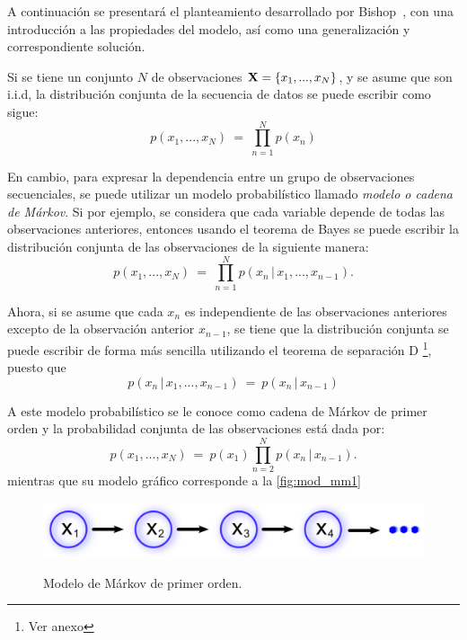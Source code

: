 A continuación se presentará el planteamiento desarrollado por Bishop~\cite{Bishop2006}, con una introducción a las propiedades del modelo, así como una generalización y correspondiente solución.

Si se tiene un conjunto $N$ de observaciones $\textbf{X} = \lbrace x_1, ..., x_N \rbrace$, y se asume que son i.i.d, la distribución conjunta de la secuencia de datos se puede escribir como sigue:
\begin{equation}
\label{eqn:2-1}
p(x_1, ..., x_N) ~=~ \prod_{n=1}^N p(x_n)
\end{equation}

En cambio, para expresar la dependencia entre un grupo de observaciones secuenciales, se puede utilizar un modelo probabilístico llamado \textit{modelo o cadena de Márkov}. Si por ejemplo, se considera que cada variable depende de todas las observaciones anteriores, entonces usando el teorema de Bayes
se puede escribir la distribución conjunta de las observaciones de la siguiente manera:
\begin{equation}
\label{eqn:2-2}
p(x_1, ..., x_N) ~=~ \prod_{n=1}^N p(x_n \,|\, x_1, ..., x_{n-1}).
\end{equation}

Ahora, si se asume que cada $x_n$ es independiente de las observaciones anteriores excepto de la observación anterior $x_{n-1}$, se tiene que la distribución conjunta se puede escribir de forma más sencilla utilizando el teorema de separación D \footnote{Ver anexo}, puesto que 
\begin{equation}
\label{eqn:2-3}
p(x_n \,|\, x_1, ..., x_{n-1}) ~=~ p(x_n \,|\, x_{n-1})
\end{equation}

A este modelo probabilístico se le conoce como cadena de Márkov de primer orden y la probabilidad conjunta de las observaciones está dada por:
\begin{equation}
\label{eqn:2-4}
p(x_1, ..., x_N) ~=~ p(x_1) \prod_{n=2}^N p(x_n \,|\, x_{n-1}).
\end{equation}
mientras que su modelo gráfico corresponde a la \autoref{fig:mod_mm1}
\begin{figure}[tp]
        \myfloatalign
        {\includegraphics[width=0.6\linewidth]{gfx/chap3/mod-mm1}}
        \caption{Modelo de Márkov de primer orden.}
        \label{fig:mod_mm1}
\end{figure}

